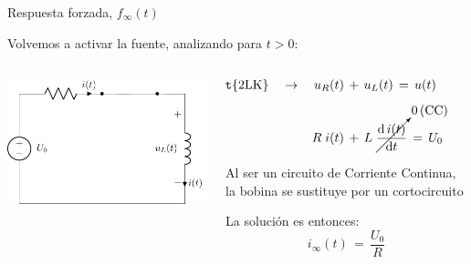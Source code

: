 \documentclass[aspectratio=169, usenames,svgnames,dvipsnames]{beamer}
\begin{document}

\begin{frame}{Respuesta forzada, \hspace{3mm}$f_\infty(t)$}
    
    \vspace{3mm}
    Volvemos a \alert{activar la fuente}, analizando para $t>0$:
    \begin{columns}
    \begin{column}{0.5\columnwidth}

        \vspace{-5mm}
        \begin{center}
            \includegraphics[height=0.55\textheight]{../figs/transitorio_circuitoRL_t0+.pdf}
        \end{center}
    \end{column}
    \hfill
    \begin{column}{0.48\columnwidth}
        \vspace{-1mm}
        \begin{align*}
          \hspace*{-16mm} \textrm{\alert{2LK}} \quad\rightarrow\quad 
          u_R(t) \,&+\, u_L(t) \, = \, u(t) \\[5pt] 
          R \; i(t) \,&+\, L\; \cancelto{0\, \textrm{(CC)}}{\diff{\, i(t)}{t}} \, = \, U_0
        \end{align*}

        \vspace{4mm}    
        Al ser un circuito de \alert{Corriente Continua}, la \alert{bobina} se sustituye por un \alert{cortocircuito}

        \vspace{6mm} 
        La \alert{solución} es entonces:
        \begin{equation*}
            \boxed{\; i_\infty(t) \,=\, \frac{U_0}{R} \;}
        \end{equation*}
        
    \end{column}
    \end{columns}  
\end{frame}
\end{document}
